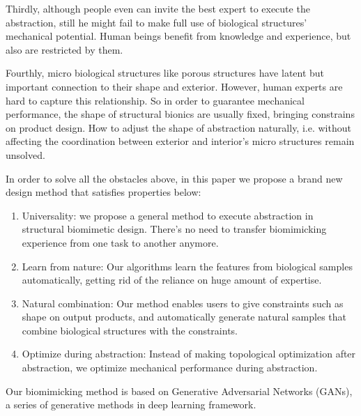 Thirdly, although people even can invite the best expert to execute the abstraction, still he might fail to make full use of biological structures' mechanical potential. Human beings benefit from knowledge and experience, but also are restricted by them.

Fourthly, micro biological structures like porous structures have latent but important connection to their shape and exterior. However, human experts are hard to capture this relationship. So in order to guarantee mechanical performance, the shape of structural bionics are usually fixed, bringing constrains on product design. How to adjust the shape of abstraction naturally, i.e. without affecting the coordination between exterior and interior’s micro structures remain unsolved.

In order to solve all the obstacles above, in this paper we propose a brand new design method that satisfies properties below: 
\begin{enumerate}
\item Universality: we propose a general method to execute abstraction in structural biomimetic design. There’s no need to transfer biomimicking experience from one task to another anymore.

\item Learn from nature: Our algorithms learn the features from biological samples automatically, getting rid of the reliance on huge amount of expertise. 

\item Natural combination: Our method enables users to give constraints such as shape on output products, and automatically generate natural samples that combine biological structures with the constraints. 

\item Optimize during abstraction: Instead of making topological optimization after abstraction, we optimize mechanical performance during abstraction.
\end{enumerate}

Our biomimicking method is based on Generative Adversarial Networks (GANs), a series of generative methods in deep learning framework.


